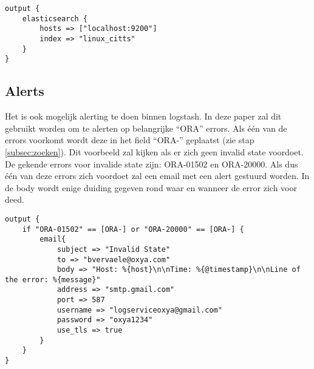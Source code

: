 \lstset{escapechar=@,style=customc}  
\begin{lstlisting}[frame=single]  
output {
	elasticsearch {
		hosts => ["localhost:9200"]
		index => "linux_citts"
	}
}
\end{lstlisting}

\subsection{Alerts}
\label{subsec:alerts}

Het is ook mogelijk alerting te doen binnen logstash. In deze paper zal dit gebruikt worden om te alerten op belangrijke  “ORA” errors. Als één van de errors voorkomt wordt deze in het field “ORA-” geplaatst (zie stap \hyperref[subsec:zoeken]{\ref{subsec:zoeken}}). Dit voorbeeld zal kijken als er zich geen invalid state voordoet. De gekende errors voor invalide state zijn: ORA-01502 en ORA-20000. Als dus één van deze errors zich voordoet zal een email met een alert gestuurd worden. In de body wordt enige duiding gegeven rond waar en wanneer de error zich voor deed.

\lstset{escapechar=@,style=customc}  
\begin{lstlisting}[frame=single]
output {
	if "ORA-01502" == [ORA-] or "ORA-20000" == [ORA-] {
		email{
			subject => "Invalid State"
			to => "bvervaele@oxya.com"
			body => "Host: %{host}\n\nTime: %{@timestamp}\n\nLine of the error: %{message}"
			address => "smtp.gmail.com"
			port => 587
			username => "logserviceoxya@gmail.com"
			password => "oxya1234"
			use_tls => true
		}
	}	 
}

\end{lstlisting}